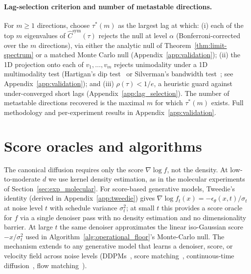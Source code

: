 \documentclass{article}
\begin{document}
\paragraph{Lag-selection criterion and number of metastable directions.}
For $m \geq 1$ directions, choose $\tau^*(m)$ as the largest lag at
which: (i) each of the top $m$ eigenvalues of $\hat C^{\mathrm{sym}}(\tau)$ rejects the null at level $\alpha$ (Bonferroni-corrected over the $m$ directions), via either the analytic null of Theorem~\ref{thm:limit-spectrum} or a matched Monte Carlo null (Appendix~\ref{app:validation});
(ii) the 1D projection onto each of $v_1, \ldots, v_m$ rejects
unimodality under a 1D multimodality test (Hartigan's dip
test~\cite{hartigan1985} or Silverman's bandwidth
test~\cite{silverman1981}; see Appendix~\ref{app:validation}); and
(iii) $\rho(\tau) < 1/e$, a heuristic guard against under-converged
short lags (Appendix~\ref{app:lag_selection}). The number of
metastable directions recovered is the maximal $m$ for which
$\tau^*(m)$ exists. Full methodology and per-experiment results in
Appendix~\ref{app:validation}.

\section{Score oracles and algorithms}
\label{sec:score_high_dim}

The canonical diffusion requires only the score $\nabla \log f$, not the density. At low-to-moderate $d$ we use kernel density estimation, as in the molecular experiments of Section~\ref{sec:exp_molecular}. For score-based generative models, Tweedie's identity (derived in Appendix~\ref{app:tweedie}) gives $\nabla \log f_t(x) = -\epsilon_\theta(x, t) / \sigma_t$ at noise level $t$ with schedule variance $\sigma_t^2$; at small $t$ this provides a score oracle for $f$ via a single denoiser pass with no density estimation and no dimensionality barrier. At large $t$ the same denoiser approximates the linear iso-Gaussian score $-x/\sigma_t^2$ used in Algorithm~\ref{alg:operational_floor}'s Monte-Carlo null. The mechanism extends to any generative model that learns a denoiser, score, or velocity field across noise levels (DDPMs~\cite{ho2020denoising}, score matching~\cite{song2019generative}, continuous-time diffusion~\cite{song2021scorebased}, flow matching~\cite{lipman2023flow}).
\end{document}
